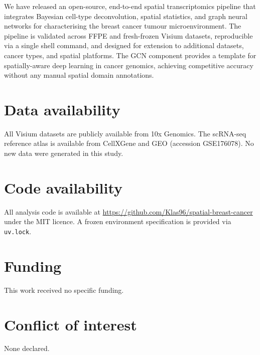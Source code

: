 \documentclass[12pt, a4paper]{article}
\begin{document}
We have released an open-source, end-to-end spatial transcriptomics pipeline
that integrates Bayesian cell-type deconvolution, spatial statistics, and graph
neural networks for characterising the breast cancer tumour microenvironment.
The pipeline is validated across FFPE and fresh-frozen Visium datasets,
reproducible via a single shell command, and designed for extension to
additional datasets, cancer types, and spatial platforms. The GCN component
provides a template for spatially-aware deep learning in cancer genomics,
achieving competitive accuracy without any manual spatial domain annotations.

\section*{Data availability}

All Visium datasets are publicly available from 10x Genomics. The scRNA-seq
reference atlas is available from CellXGene and GEO (accession GSE176078).
No new data were generated in this study.

\section*{Code availability}

All analysis code is available at
\url{https://github.com/Klas96/spatial-breast-cancer} under the MIT licence.
A frozen environment specification is provided via \texttt{uv.lock}.

\section*{Funding}

This work received no specific funding.

\section*{Conflict of interest}

None declared.



\end{document}
